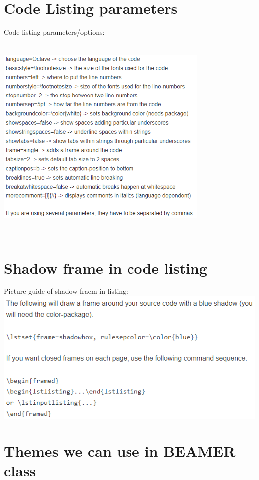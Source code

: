 \documentclass[10 pt]{book}
\begin{document}
\begin{enumerate}
\section{Code Listing parameters}
Code listing parameters/options:\\
\includegraphics[width=290pt, height=300pt]{../Code listing parameters.png} 

\section{Shadow frame in code listing}
Picture guide of shadow fraem in listing:\\
\includegraphics[scale=1]{../Shadow frame in code listing.png}

\section{Themes we can use in BEAMER class}

\end{enumerate}
\end{document}
